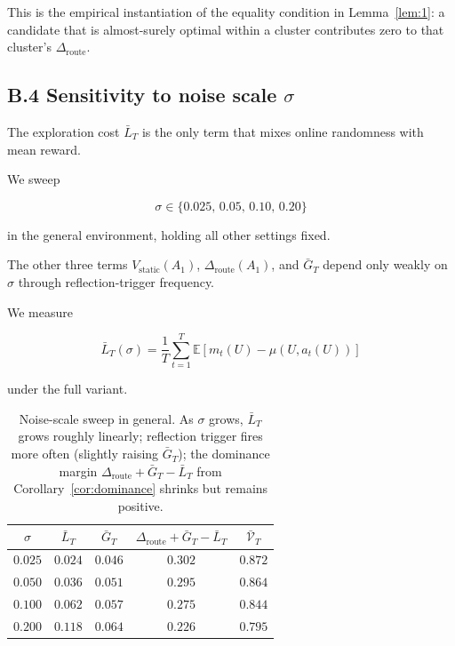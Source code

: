 \documentclass{article} %
\begin{document}
This is the empirical instantiation of the equality condition in Lemma~\ref{lem:1}: a candidate that is almost-surely optimal within a cluster contributes zero to that cluster's $\Delta_{\mathrm{route}}$.

\subsection{B.4 Sensitivity to noise scale $\sigma$}

\label{app:sigma-sweep}

The exploration cost $\bar{L}_T$ is the only term that mixes online randomness with mean reward.

We sweep

\begin{equation}
\label{eq:app-sigma-grid}
\sigma \in \{0.025,\, 0.05,\, 0.10,\, 0.20\}
\end{equation}

in the general environment, holding all other settings fixed.

The other three terms $V_{\mathrm{static}}(A_1)$, $\Delta_{\mathrm{route}}(A_1)$, and $\bar{G}_T$ depend only weakly on $\sigma$ through reflection-trigger frequency.

We measure

\begin{equation}
\label{eq:app-LT-of-sigma}
\bar{L}_T(\sigma) = \frac{1}{T}\sum_{t=1}^{T}\mathbb{E}[m_t(U)-\mu(U,a_t(U))]
\end{equation}

under the full variant.

\begin{table}[h]
\centering
\small
\begin{tabular}{ccccc}
\toprule
$\sigma$ & $\bar{L}_T$ & $\bar{G}_T$ & $\Delta_{\mathrm{route}}+\bar{G}_T-\bar{L}_T$ & $\bar{\mathcal{V}}_T$ \\
\midrule
$0.025$ & $0.024$ & $0.046$ & $0.302$ & $0.872$ \\
$0.050$ & $0.036$ & $0.051$ & $0.295$ & $0.864$ \\
$0.100$ & $0.062$ & $0.057$ & $0.275$ & $0.844$ \\
$0.200$ & $0.118$ & $0.064$ & $0.226$ & $0.795$ \\
\bottomrule
\end{tabular}
\caption{Noise-scale sweep in general. As $\sigma$ grows, $\bar{L}_T$ grows roughly linearly; reflection trigger fires more often (slightly raising $\bar{G}_T$); the dominance margin $\Delta_{\mathrm{route}}+\bar{G}_T-\bar{L}_T$ from Corollary~\ref{cor:dominance} shrinks but remains positive.}
\label{tab:app-sigma}
\end{table}
\end{document}
